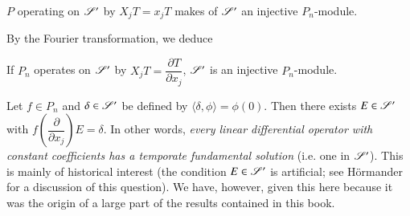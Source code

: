 \begin{theorem}\label{chap7-thm4.1}
$P$ operating on $\mathscr{S}'$ by $X_{j}T=x_{j}T$ makes of $\mathscr{S}'$ an injective $P_{n}$-module.
\end{theorem}

By the Fourier transformation, we deduce

\setcounter{theorem}{0}
\begin{theorem}\label{chap7-add-thm4.1}
If $P_{n}$ operates on $\mathscr{S}'$ by $X_{j}T=\dfrac{\partial T}{\partial x_{j}}$, $\mathscr{S}'$ is an injective $P_{n}$-module.
\end{theorem}

\begin{example}\label{chap7-exam4.2}
Let $f\in P_{n}$ and $\delta\in \mathscr{S}'$ be defined by $\langle \delta, \phi\rangle=\phi(0)$. Then there exists $E\in \mathscr{S}'$ with $f\left(\dfrac{\partial}{\partial x_{j}}\right)E=\delta$. In other words, {\em every linear differential operator with constant coefficients has a temporate fundamental solution} (i.e. one in $\mathscr{S}'$). This is mainly of historical interest (the condition $E\in \mathscr{S}'$ is artificial; see H\"ormander \cite{L. Hormander : 2} for a discussion of this question). We have, however, given this here because it was the origin of a large part of the results contained in this book.
\end{example}

